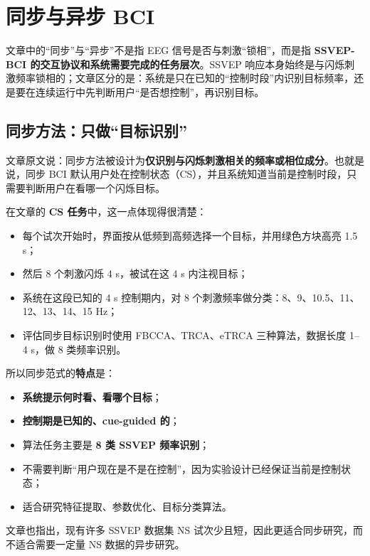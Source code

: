 \documentclass[12pt, a4paper]{ctexart}
\begin{document}
\section{同步与异步 BCI}

文章中的``同步''与``异步''不是指 EEG 信号是否与刺激``锁相''，而是指 \textbf{SSVEP-BCI 的交互协议和系统需要完成的任务层次}。SSVEP 响应本身始终是与闪烁刺激频率锁相的；文章区分的是：系统是只在已知的``控制时段''内识别目标频率，还是要在连续运行中先判断用户``是否想控制''，再识别目标。

\subsection{同步方法：只做``目标识别''}

文章原文说：同步方法被设计为\textbf{仅识别与闪烁刺激相关的频率或相位成分}。也就是说，同步 BCI 默认用户处在控制状态（CS），并且系统知道当前是控制时段，只需要判断用户在看哪一个闪烁目标。

在文章的 \textbf{CS 任务}中，这一点体现得很清楚：

\begin{itemize}
  \item 每个试次开始时，界面按从低频到高频选择一个目标，并用绿色方块高亮 1.5 s；
  \item 然后 8 个刺激闪烁 4 s，被试在这 4 s 内注视目标；
  \item 系统在这段已知的 4 s 控制期内，对 8 个刺激频率做分类：8、9、10.5、11、12、13、14、15 Hz；
  \item 评估同步目标识别时使用 FBCCA、TRCA、eTRCA 三种算法，数据长度 1--4 s，做 8 类频率识别。
\end{itemize}

所以同步范式的\textbf{特点}是：

\begin{itemize}
  \item \textbf{系统提示何时看、看哪个目标}；
  \item \textbf{控制期是已知的、cue-guided 的}；
  \item 算法任务主要是 \textbf{8 类 SSVEP 频率识别}；
  \item 不需要判断``用户现在是不是在控制''，因为实验设计已经保证当前是控制状态；
  \item 适合研究特征提取、参数优化、目标分类算法。
\end{itemize}

文章也指出，现有许多 SSVEP 数据集 NS 试次少且短，因此更适合同步研究，而不适合需要一定量 NS 数据的异步研究。
\end{document}
